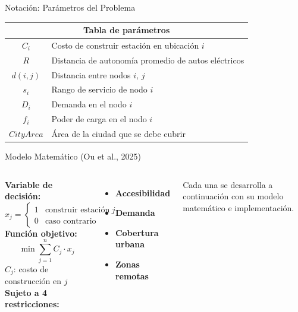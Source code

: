 \documentclass[aspectratio=169, 12pt]{beamer}
\newcommand{\acento}[1]{\textcolor{Verde}{\textbf{#1}}}
\newcommand{\acentob}[1]{\textcolor{Cian}{#1}}
\newcommand{\gris}[1]{\textcolor{GrisAzul}{#1}}
\begin{document}
\begin{frame}{Notación: Parámetros del Problema}
  \begin{center}
  \renewcommand{\arraystretch}{1.25}
  \begin{tabular}{|c|l|}
    \hline
    \multicolumn{2}{|c|}{\textbf{Tabla de parámetros}} \\
    \hline
    $C_i$       & Costo de construir estación en ubicación $i$ \\
    $R$         & Distancia de autonomía promedio de autos eléctricos \\
    $d(i,j)$    & Distancia entre nodos $i,\,j$ \\
    $s_i$       & Rango de servicio de nodo $i$ \\
    $D_i$       & Demanda en el nodo $i$ \\
    $f_i$       & Poder de carga en el nodo $i$ \\
    $CityArea$  & Área de la ciudad que se debe cubrir \\
    \hline
  \end{tabular}
  \end{center}
\end{frame}

\begin{frame}{Modelo Matemático \gris{(Ou et al., 2025)}}
  \begin{columns}
    \textbf{Variable de decisión:}
    \[
      x_j = \begin{cases}1 & \text{construir estación en }j\\0 & \text{caso contrario}\end{cases}
    \]
    \vspace{0.1em}
    \textbf{Función objetivo:}
    \[
      \min \sum_{j=1}^{n} C_j \cdot x_j
    \]
    \acentob{$C_j$}: costo de construcción en $j$
    \textbf{Sujeto a 4 restricciones:}
    \vspace{0.5em}
    \begin{itemize}
      \item[\acento{R1}] \textbf{Accesibilidad}
      \vspace{0.15em}
      \item[\acento{R2}] \textbf{Demanda}
      \vspace{0.15em}
      \item[\acento{R3}] \textbf{Cobertura urbana}
      \vspace{0.15em}
      \item[\acento{R4}] \textbf{Zonas remotas}
    \end{itemize}
    \vspace{0.6em}
    {\footnotesize\gris{Cada una se desarrolla a continuación con su modelo matemático e implementación.}}
  \end{columns}
\end{frame}
\end{document}
